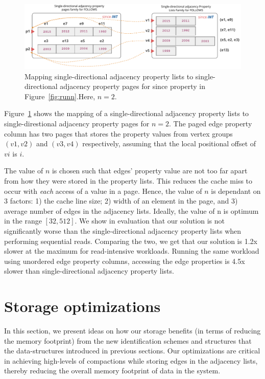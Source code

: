 \begin{figure}
	\vspace{-40pt}
	\hfill\includegraphics[scale=0.78]{img/paged}\hspace*{\fill}
	\captionsetup{justification=centering}
	\caption{Mapping single-directional adjacency property lists to single-directional adjacency property pages for since property in Figure~\ref{fig:runn}.Here, $n=2$.}
	\label{fig:paged}
	\vspace{-5pt}
\end{figure}

Figure~\ref{fig:paged} shows the mapping of a single-directional adjacency property lists to single-direstional adjacency property pages for $n=2$. The paged edge property column has two pages that stores the property values from vertex groups $(v1,v2)$ and $(v3,v4)$ respectively, assuming that the local positional offset of $vi$ is $i$.

The value of $n$ is chosen such that edges' property value are not too far apart from how they were stored in the property lists. This reduces the cache miss to occur with \emph{each} access of a value in a page. Hence, the value of $n$ is dependant on 3 factors: 1) the cache line size; 2) width of an element in the page, and 3) average number of edges in the adjacency lists. Ideally, the value of n is optimum in the range $[32, 512]$. We show in evaluation that our solution is not significantly worse than the single-directional adjacency property lists when performing sequential reads. Comparing the two, we get that our solution is 1.2x slower at the maximum for read-intensive workloads. Running the same workload using unordered edge property columns, accessing the edge properties is 4.5x slower than single-directional adjacency property lists.

\section{Storage optimizations}
\label{sec:storage-optimizations}

In this section, we present ideas on how our storage benefits (in terms of reducing the memory footprint) from the new identification schemes and structures that the data-structures introduced in previous sections. Our optimizations are critical in achieving high-levels of compactions while storing edges in the adjacency lists, thereby reducing the overall memory footprint of data in the system.

